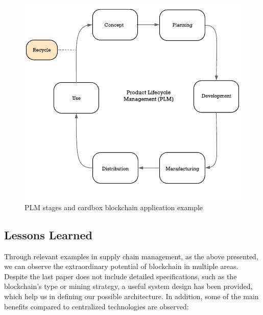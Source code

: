 \begin{figure}
	\includegraphics[width=1\linewidth]{gfx/supplyChain}    
  \caption{ PLM stages and cardbox blockchain application example \citep{stark2015product}}
  \label{fig:supplyChain}
\end{figure}

\subsection{Lessons Learned}

Through relevant examples in supply chain management, as the above presented, we can observe the extraordinary potential of blockchain in multiple areas. Despite the last paper does not include detailed specifications, such as the blockchain's type or mining strategy, a useful system design has been provided, which help us in defining our possible architecture. In addition, some of the main benefits compared to centralized technologies are observed:

